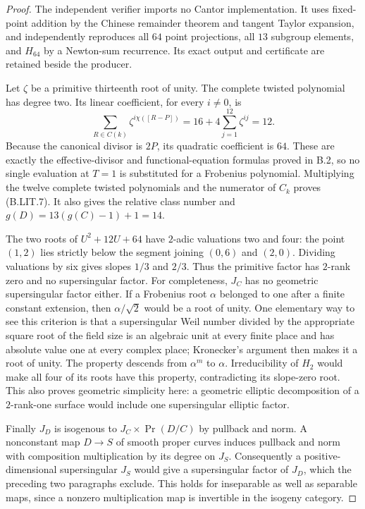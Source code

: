 \documentclass[11pt,a4paper]{article}
\begin{document}
\begin{proof}
The independent verifier
 imports no Cantor
implementation. It uses fixed-point addition by the
Chinese remainder theorem and tangent Taylor expansion,
and independently reproduces all $64$ point projections,
all $13$ subgroup elements, and $H_{64}$ by a Newton-sum
recurrence. Its exact output and certificate are retained
beside the producer.

Let $\zeta$ be a primitive thirteenth root of unity.
The complete twisted polynomial has degree two. Its
linear coefficient, for every $i\ne0$, is
\[
 \sum_{R\in C(k)}\zeta^{i\chi([R-P])}
       =16+4\sum_{j=1}^{12}\zeta^{ij}=12.
\]
Because the canonical divisor is $2P$, its quadratic
coefficient is $64$. These are exactly the effective-divisor
and functional-equation formulas proved in B.2, so no
single evaluation at $T=1$ is substituted for a Frobenius
polynomial. Multiplying the twelve complete twisted
polynomials and the numerator of $C_k$ proves (B.LIT.7).
It also gives the relative class number and
$g(D)=13(g(C)-1)+1=14$.

The two roots of $U^2+12U+64$ have $2$-adic valuations
two and four: the point $(1,2)$ lies strictly below the
segment joining $(0,6)$ and $(2,0)$. Dividing valuations
by six gives slopes $1/3$ and $2/3$. Thus the primitive
factor has $2$-rank zero and no supersingular factor.
For completeness, $J_C$ has no geometric supersingular
factor either. If a Frobenius root $\alpha$ belonged to
one after a finite constant extension, then
$\alpha/\sqrt2$ would be a root of unity. One elementary
way to see this criterion is that a supersingular Weil
number divided by the appropriate square root of the
field size is an algebraic unit at every finite place
and has absolute value one at every complex place;
Kronecker's argument then makes it a root of unity.
The property descends from $\alpha^m$ to $\alpha$.
Irreducibility of $H_2$ would make all four of its roots
have this property, contradicting its slope-zero root.
This also proves geometric simplicity here: a geometric
elliptic decomposition of a $2$-rank-one surface would
include one supersingular elliptic factor.

Finally $J_D$ is isogenous to $J_C\times\Pr(D/C)$
by pullback and norm. A nonconstant map $D\to S$ of
smooth proper curves induces pullback and norm with
composition multiplication by its degree on $J_S$.
Consequently a positive-dimensional supersingular
$J_S$ would give a supersingular factor of $J_D$,
which the preceding two paragraphs exclude. This holds
for inseparable as well as separable maps, since a
nonzero multiplication map is invertible in the
isogeny category.
\end{proof}
\end{document}
